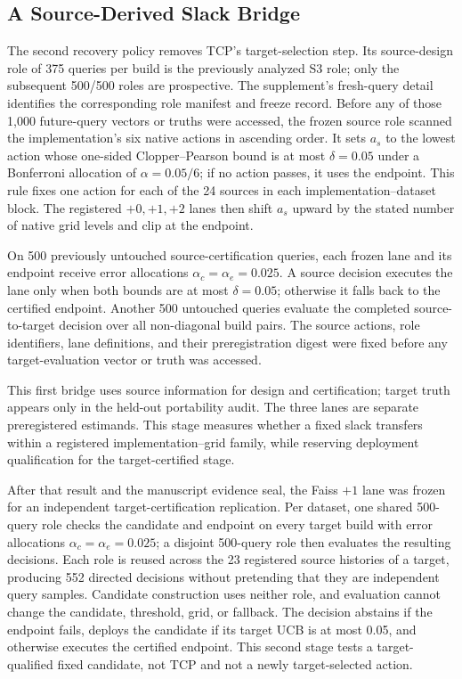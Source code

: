\subsection{A Source-Derived Slack Bridge}
\label{sec:slack-method}
The second recovery policy removes TCP's target-selection step. Its source-design role of 375 queries per build is the previously analyzed S3 role; only the subsequent 500/500 roles are prospective. The supplement's fresh-query detail identifies the corresponding role manifest and freeze record. Before any of those 1,000 future-query vectors or truths were accessed, the frozen source role scanned the implementation's six native actions in ascending order. It sets $a_s$ to the lowest action whose one-sided Clopper--Pearson bound is at most $\delta=0.05$ under a Bonferroni allocation of $\alpha=0.05/6$; if no action passes, it uses the endpoint. This rule fixes one action for each of the 24 sources in each implementation--dataset block. The registered $+0,+1,+2$ lanes then shift $a_s$ upward by the stated number of native grid levels and clip at the endpoint.

On 500 previously untouched source-certification queries, each frozen lane and its endpoint receive error allocations $\alpha_c=\alpha_e=0.025$. A source decision executes the lane only when both bounds are at most $\delta=0.05$; otherwise it falls back to the certified endpoint. Another 500 untouched queries evaluate the completed source-to-target decision over all non-diagonal build pairs. The source actions, role identifiers, lane definitions, and their preregistration digest were fixed before any target-evaluation vector or truth was accessed.

This first bridge uses source information for design and certification; target truth appears only in the held-out portability audit. The three lanes are separate preregistered estimands. This stage measures whether a fixed slack transfers within a registered implementation--grid family, while reserving deployment qualification for the target-certified stage.

After that result and the manuscript evidence seal, the Faiss $+1$ lane was frozen for an independent target-certification replication. Per dataset, one shared 500-query role checks the candidate and endpoint on every target build with error allocations $\alpha_c=\alpha_e=0.025$; a disjoint 500-query role then evaluates the resulting decisions. Each role is reused across the 23 registered source histories of a target, producing 552 directed decisions without pretending that they are independent query samples. Candidate construction uses neither role, and evaluation cannot change the candidate, threshold, grid, or fallback. The decision abstains if the endpoint fails, deploys the candidate if its target UCB is at most 0.05, and otherwise executes the certified endpoint. This second stage tests a target-qualified fixed candidate, not TCP and not a newly target-selected action.
